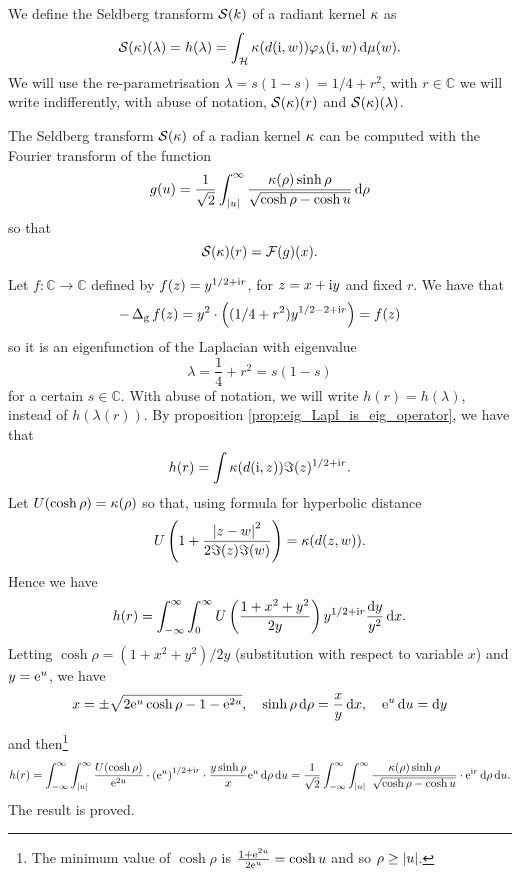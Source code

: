 We define the Seldberg transform $\operatorname{\mathcal{S}}(k)$ of a radiant kernel $\kappa$ as %
\begin{equation}
\label{eq:def_seldberg_transform}
\operatorname{\mathcal{S}}(\kappa)(\lambda)=h(\lambda)=\int_{\mathcal{H}}\kappa(d(\mathrm{i},w))\varphi_{\lambda}(\mathrm{i},w)\mathop{}\!\mathrm{d}\mu(w).
\end{equation}
We will use the re-parametrisation $\lambda=s(1-s)=1/4+r^{2}$, with $r\in\mathbb{C}$ we will write indifferently, with abuse of notation, $\operatorname{\mathcal{S}}(\kappa)(r)$ and $\operatorname{\mathcal{S}}(\kappa)(\lambda)$.

\begin{nprop}
\label{prop:seld_transform_formula}
The Seldberg transform $\operatorname{\mathcal{S}}(\kappa)$ of a radian kernel $\kappa$ can be computed with the Fourier transform of the function
\[
g(u)=\frac{1}{\sqrt{2}}\int_{\left| u\right|}^{\infty}\frac{\kappa(\rho)\sinh\rho}{\sqrt{\cosh\rho-\cosh u}}\mathop{}\!\mathrm{d}\rho
\]
so that 
\[
\operatorname{\mathcal{S}}(\kappa)(r)=\operatorname{\mathcal{F}}(g)(x).
\]
\end{nprop}
\begin{prf}
Let $f\colon\mathbb{C}\to\mathbb{C}$ defined by $f(z)=y^{1/2+\mathrm{i} r}$, for $z=x+\mathrm{i} y$ and fixed $r$. We have that
\[
-\operatorname{\Delta}_{\mathrm{g}}f(z)=y^{2}\cdot\left((1/4+ r^{2}) y^{1/2-2+\mathrm{i} r}\right)=f(z)
\]
so it is an eigenfunction of the Laplacian with eigenvalue
\[
\lambda=\frac{1}{4}+r^{2}=s(1-s)
\]
for a certain $s\in\mathbb{C}$. With abuse of notation, we will write $h(r)=h(\lambda)$, instead of $h(\lambda(r))$. By proposition \ref{prop:eig_Lapl_is_eig_operator}, we have that
\[
h(r)=\int\kappa(d(\mathrm{i},z))\Im(z)^{1/2+\mathrm{i} r}.
\]
Let $U(\cosh\rho)=\kappa(\rho)$ so that, using formula for hyperbolic distance
\[
U\left(
1+\frac{\left| z-w\right|^{2}}{2\Im(z)\Im(w)}
\right)=\kappa(d(z,w)).
\]
Hence we have 
\[
h(r)=\int_{-\infty}^{\infty}\int_{0}^{\infty}U\left(
\frac{1+x^{2}+y^{2}}{2y}
\right)y^{1/2+\mathrm{i} r}\frac{\mathop{}\!\mathrm{d} y}{y^{2}}\mathop{}\!\mathrm{d} x.
\]
Letting $\cosh\rho=(1+x^{2}+y^{2})/2y$ (substitution with respect to variable $x$) and $y=\mathrm{e}^{u}$, we have
\[
x=\pm\sqrt{2\mathrm{e}^{u}\cosh\rho-1-\mathrm{e}^{2u}},\quad \sinh\rho\mathop{}\!\mathrm{d}\rho=\frac{x}{y}\mathop{}\!\mathrm{d} x,\quad \mathrm{e}^{u}\mathop{}\!\mathrm{d} u=\mathop{}\!\mathrm{d} y
\]
and then\footnote{The minimum value of $\cosh\rho$ is $\frac{1+\mathrm{e}^{2u}}{2\mathrm{e}^{u}}=\cosh u$ and so $\rho\geq\left| u\right|$.}
\[
h(r)=\int_{-\infty}^{\infty}\int_{\left| u\right|}^{\infty}\frac{U(\cosh\rho)}{\mathrm{e}^{2u}}\cdot\left(\mathrm{e}^{u}\right)^{1/2+\mathrm{i} r}\cdot\frac{y\sinh\rho}{x} \mathrm{e}^{u}\mathop{}\!\mathrm{d} \rho\mathop{}\!\mathrm{d} u=\frac{1}{\sqrt{2}}\int_{-\infty}^{\infty}\int_{\left| u\right|}^{\infty}\frac{\kappa(\rho)\sinh\rho}{\sqrt{\cosh\rho-\cosh u}}\cdot \mathrm{e}^{\mathrm{i} r}\mathop{}\!\mathrm{d} \rho\mathop{}\!\mathrm{d} u.
\]
The result is proved.
\end{prf}

